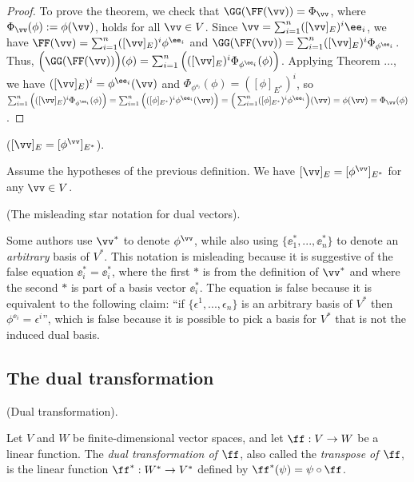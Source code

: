 \begin{proof}
    To prove the theorem, we check that $\GG(\FF(\vv)) = \Phi_\vv$, where $\Phi_\vv(\phi) := \phi(\vv)$, holds for all $\vv \in V$. Since $\vv = \sum_{i = 1}^n ([\vv]_E)^i \ee_i$, we have $\FF(\vv) = \sum_{i = 1}^n ([\vv]_E)^i \phi^{\ee_i}$ and $\GG(\FF(\vv)) = \sum_{i = 1}^n ([\vv]_E)^i \Phi_{\phi^{\ee_i}}$. Thus, $\Big(\GG(\FF(\vv))\Big)(\phi) = \sum_{i = 1}^n \Big( ([\vv]_E)^i \Phi_{\phi^{\ee_i}}(\phi) \Big)$. Applying Theorem ..., we have $([\vv]_E)^i = \phi^{\ee_i}(\vv)$ and $\Phi_{\phi^{\ee_i}}(\phi) = ([\phi]_{E^*})^i$, so $\sum_{i = 1}^n \Big( ([\vv]_E)^i \Phi_{\phi^{\ee_i}}(\phi) \Big) = \sum_{i = 1}^n \Big( ([\phi]_{E^*})^i \phi^{\ee_i}(\vv) \Big) = \Big(\sum_{i = 1}^n ([\phi]_{E^*})^i \phi^{\ee_i}\Big)(\vv) = \phi(\vv) = \Phi_\vv(\phi)$.
\end{proof}

\begin{theorem}
    \label{ch::bilinear_forms_metric_tensors::thm:vv_E_eq_phi_vv_Estar}
    
    ($[\vv]_E = [\phi^\vv]_{E^*}$).
    
    Assume the hypotheses of the previous definition. We have $[\vv]_E = [\phi^\vv]_{E^*}$ for any $\vv \in V$.
\end{theorem}

\begin{remark}
    (The misleading star notation for dual vectors).
    
    Some authors use $\vv^*$ to denote $\phi^\vv$, while also using $\{\ee_1^*, ..., \ee_n^*\}$ to denote an \textit{arbitrary} basis of $V^*$. This notation is misleading because it is suggestive of the false equation $\ee_i^* = \ee_i^*$, where the first $*$ is from the definition of $\vv^*$ and where the second $*$ is part of a basis vector $\ee_i^*$. The equation is false because it is equivalent to the following claim: ``if $\{\epsilon^1, ..., \epsilon_n\}$ is an arbitrary basis of $V^*$ then $\phi^{\ee_i} = \epsilon^i$'', which is false because it is possible to pick a basis for $V^*$ that is not the induced dual basis.
\end{remark}

\subsection*{The dual transformation}

\begin{defn}
\label{ch::motivated_intro::defn::dual_transf}
    (Dual transformation).
    
    Let $V$ and $W$ be finite-dimensional vector spaces, and let $\ff:V \rightarrow W$ be a linear function.
    The \textit{dual transformation of $\ff$}, also called the \textit{transpose of $\ff$}, is the linear function $\ff^*:W^* \rightarrow V^*$ defined by $\ff^*(\psi) = \psi \circ \ff$.
\end{defn}

